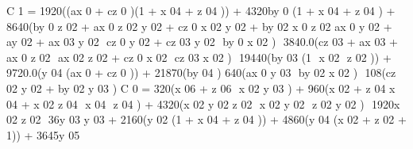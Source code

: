 C 1  = 1920((ax 0  + cz 0 )(1 + x 04  + z 04 )) + 4320by 0 (1 +  x 04  + z 04 ) + 8640(­by 0 z 02 + 
ax 0 z 02 y 02  + cz 0  x 02  y 02  + by 02 x 0 z 02  ­ ax 0 y 02 + ay 02 + ax 03 y 02  ­ cz 0 y 02 + cz 03 y 02  ­ by 0 x 02 ) ­ 
3840.0(cz 03  + ax 03  + ax 0 z 02  ­ ax 02 z 02  + cz 0 x 02  ­ cz 03 x 02 ) ­ 19440(by 03 (1 ­ x 02  ­ z 02 )) + 
9720.0(y 04 (ax 0  + cz 0 )) + 21870(by 04 )­ 640(ax 0 y 03  ­ by 02 x 02 ) ­ 108(cz 02 y 02  + by 02 y 03 ) 
C 0  = 320(­x 06  + z 06  ­ x 02 y 03 ) + 960(x 02  + z 04 x 04  + x 02 z 04 ­ x 04  ­ z 04 )  + 4320(x 02 y 02 z 02  ­ 
x 02 y 02  ­ z 02 y 02 ) ­ 1920x 02 z 02  ­ 36y 03 y 03  + 2160(y 02 (1 + x 04  + z 04 )) + 4860(y 04 (x 02  + z 02  
+ 1)) + 3645y 05
